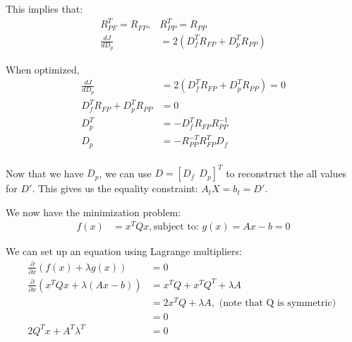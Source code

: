 \documentclass[11pt]{article}
\begin{document}
This implies that:
\begin{align*}
R_{PF}^T = R_{FP}, & R_{PP}^T = R_{PP} \\
\frac{dJ}{d D_p} &= 2(D_f^T R_{FP} + D_p^T R_{PP})
\end{align*}

When optimized, 
\begin{align*}
\frac{dJ}{d D_p} &= 2(D_f^T R_{FP} + D_p^T R_{PP}) = 0 \\
D_f^T R_{FP} + D_p^T R_{PP} &= 0 \\
D_p^T &= -D_f^T R_{FP} R_{PP}^{-1} \\
D_p &= -R_{PP}^{-T} R_{FP}^T D_f \\
\end{align*}

Now that we have $D_p$, we can use $D = [D_f \ \ D_p]^T$ to reconstruct the all values for $D'$. This gives us the equality constraint: $A_t X = b_t = D'$.


\mbox{} \newline
We now have the minimization problem:
\begin{align*}
f(x) &= x^T Q x, \text{subject to: } g(x) = Ax-b = 0
\end{align*}

We can set up an equation using Lagrange multipliers:
\begin{align}
\nonumber \frac{\partial}{\partial x} ( f(x) + \lambda g(x) ) &= 0 \\
\nonumber \frac{\partial}{\partial x} ( x^T Q x + \lambda (Ax-b) ) &= x^T Q + x^T Q^T + \lambda A \\
\nonumber &= 2 x^T Q + \lambda A, \text{ (note that Q is symmetric) } \\
\nonumber &= 0 \\
\label{eqn: analytic} 2Q^T x + A^T \lambda^T &= 0 
\end{align}
\end{document}
